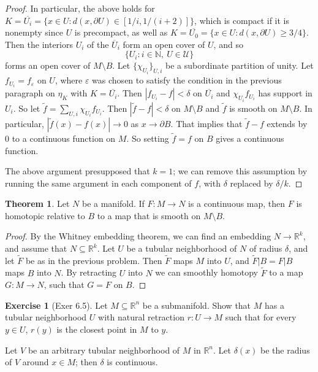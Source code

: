 \documentclass[10pt]{article}
\newcommand{\NN}{\mathbb{N}}
\newcommand{\RR}{\mathbb{R}}
\theoremstyle{definition}
\newtheorem{exer}{Exercise}
\newtheorem{theorem}[lemma]{Theorem}
\begin{document}
\begin{proof}
In particular, the above holds for $K = \overline{U_i} = \{x \in U: d(x, \partial U) \in [1/i, 1/(i+2)]\}$, which is compact if it is nonempty since $U$ is precompact, as well as $K = \overline{U_0} = \{x \in U: d(x, \partial U) \geq 3/4\}$.
Then the interiors $U_i$ of the $\overline U_i$ form an open cover of $U$, and so
$$\{U_i: i \in \NN, ~U \in \mathcal U\}$$
forms an open cover of $M \setminus B$. Let $\{\chi_{U_i}\}_{U,i}$ be a subordinate partition of unity.
Let $f_{U_i} = f_\varepsilon$ on $U$, where $\varepsilon$ was chosen to satisfy the condition in the previous paragraph on $\eta_K$ with $K = \overline{U_i}$.
Then $|f_{U_i} - f| < \delta$ on $\overline{U_i}$ and $\chi_{U_i} f_{U_i}$ has support in $U_i$. So let $\tilde f = \sum_{U,i} \chi_{U_i} f_{U_i}$.
Then $|\tilde f - f| < \delta$ on $M \setminus B$ and $\tilde f$ is smooth on $M \setminus B$.
In particular, $|\tilde f(x) - f(x)| \to 0$ as $x \to \partial B$.
That implies that $\tilde f - f$ extends by $0$ to a continuous function on $M$.
So setting $\tilde f = f$ on $B$ gives a continuous function.

The above argument presupposed that $k = 1$; we can remove this assumption by running the same argument in each component of $f$, with $\delta$ replaced by $\delta/k$.
\end{proof}

\begin{theorem}
Let $N$ be a manifold. If $F: M \to N$ is a continuous map, then $F$ is homotopic relative to $B$ to a map that is smooth on $M \setminus B$.
\end{theorem}
\begin{proof}
By the Whitney embedding theorem, we can find an embedding $N \to \RR^k$, and assume that $N \subseteq \RR^k$.
Let $U$ be a tubular neighborhood of $N$ of radius $\delta$, and let $\tilde F$ be as in the previous problem.
Then $\tilde F$ maps $M$ into $U$, and $\tilde F|B = F|B$ maps $B$ into $N$.
By retracting $U$ into $N$ we can smoothly homotopy $\tilde F$ to a map $G: M \to N$, such that $G = F$ on $B$.
\end{proof}

\begin{exer}[Exer 6.5]
Let $M \subseteq \RR^n$ be a submanifold. Show that $M$ has a tubular neighborhood $U$ with natural retraction $r: U \to M$ such that for every $y \in U$, $r(y)$ is the closest point in $M$ to $y$.
\end{exer}

Let $V$ be an arbitrary tubular neighborhood of $M$ in $\RR^n$. Let $\delta(x)$ be the radius of $V$ around $x \in M$; then $\delta$ is continuous.
\end{document}
